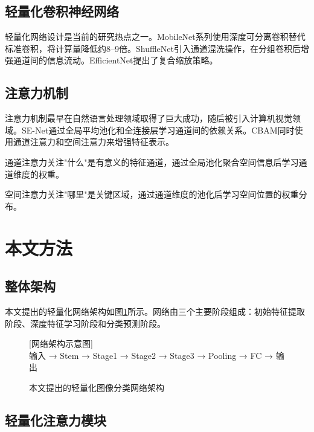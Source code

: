 \documentclass{harryopo-paper}
\begin{document}
\subsection{轻量化卷积神经网络}

轻量化网络设计是当前的研究热点之一。MobileNet系列\cite{howard2017mobilenets}使用深度可分离卷积替代标准卷积，将计算量降低约8--9倍。ShuffleNet\cite{zhang2018shufflenet}引入通道混洗操作，在分组卷积后增强通道间的信息流动。EfficientNet\cite{tan2019efficientnet}提出了复合缩放策略。

\subsection{注意力机制}

注意力机制最早在自然语言处理领域取得了巨大成功，随后被引入计算机视觉领域。SE-Net通过全局平均池化和全连接层学习通道间的依赖关系。CBAM同时使用通道注意力和空间注意力来增强特征表示。

通道注意力关注"什么"是有意义的特征通道，通过全局池化聚合空间信息后学习通道维度的权重。

空间注意力关注"哪里"是关键区域，通过通道维度的池化后学习空间位置的权重分布。

\section{本文方法}

\subsection{整体架构}

本文提出的轻量化网络架构如图\ref{fig:architecture}所示。网络由三个主要阶段组成：初始特征提取阶段、深度特征学习阶段和分类预测阶段。

\begin{figure}[htbp]
    \centering
    \colorbox{gray!10}{\parbox{0.85\textwidth}{\centering\vspace{2cm}%
        {\large\color{gray} [网络架构示意图]}\\[0.5cm]
        \small 输入 → Stem → Stage1 → Stage2 → Stage3 → Pooling → FC → 输出
    \vspace{2cm}}}
    \caption{本文提出的轻量化图像分类网络架构}
    \label{fig:architecture}
\end{figure}

\subsection{轻量化注意力模块}
\end{document}
